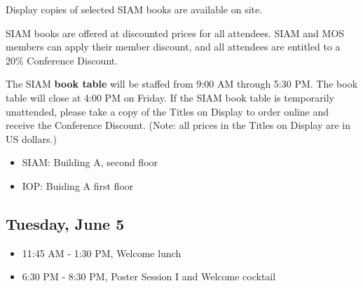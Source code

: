 
\noindent Display copies of selected SIAM books are available on site. 

\bigskip

\noindent SIAM books are offered at discounted prices for all attendees. 
SIAM and MOS members can apply their member discount, and all attendees are entitled to a 20\% Conference Discount. 

\bigskip

\noindent The SIAM \textbf{book table} will be staffed from 9:00 AM through 5:30 PM. 
The book table will close at 4:00 PM on Friday. 
If the SIAM book table is temporarily unattended, please take a copy of the Titles on Display to order online and receive the Conference Discount. 
(Note: all prices in the Titles on Display are in US dollars.)   


\begin{itemize}
  \item SIAM: Building A, second floor
  \item IOP: Buiding A first floor
\end{itemize}


\subsection*{Tuesday, June 5}

\begin{itemize}
  \item[] 11:45 AM - 1:30 PM, Welcome lunch
  \item[] 6:30 PM - 8:30 PM, Poster Session I and Welcome cocktail
\end{itemize}

